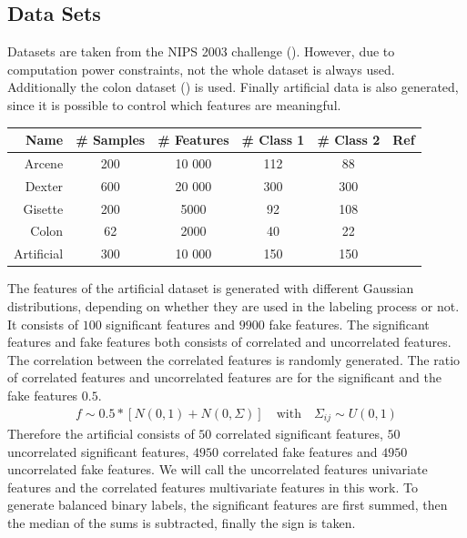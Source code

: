 \documentclass[twoside,11pt]{article}
\begin{document}
\subsection{Data Sets}
Datasets are taken from the NIPS 2003 challenge (\cite{NIPS}). However, due to computation power constraints, not the whole dataset is always used. Additionally the colon dataset (\cite{alon1999broad}) is used. Finally artificial data is also generated, since it is possible to control which features are meaningful. 

\begin{center}
    \begin{tabular}{| r | c | c | c | c | c |}
    \hline
    Name & \# Samples & \# Features & \# Class 1 & \# Class 2 & Ref\\ \hline
    Arcene & 200 & 10 000 & 112 & 88 & \cite{NIPS} \\
    Dexter & 600 & 20 000 & 300 & 300 & \cite{NIPS} \\
    Gisette & 200 & 5000 & 92 & 108 & \cite{NIPS} \\
    Colon & 62 & 2000 & 40 & 22 &  \cite{alon1999broad} \\
    Artificial & 300 & 10 000 & 150 & 150 & \\
    \hline
    \end{tabular}
\end{center}

The features of the artificial dataset is generated with different Gaussian distributions, depending on whether they are used in the labeling process or not. It consists of $100$ significant features and $9900$ fake features. The significant features and fake features both consists of correlated and uncorrelated features. The correlation between the correlated features is randomly generated. The ratio of correlated features and uncorrelated features are for the significant and the fake features $0.5$. 
\begin{align}
f \sim0.5 * \left[ N(0, 1) + N(0, \Sigma) \right]  \quad \text{with} \quad \Sigma_{ij} \sim U(0,1)
\end{align}
Therefore the artificial consists of $50$ correlated significant features, $50$ uncorrelated significant features, $4950$ correlated fake features and $4950$ uncorrelated fake features. We will call the uncorrelated features univariate features and the correlated features multivariate features in this work.
To generate balanced binary labels, the significant features are first summed, then the median of the sums is subtracted, finally the sign is taken. 
\end{document}
